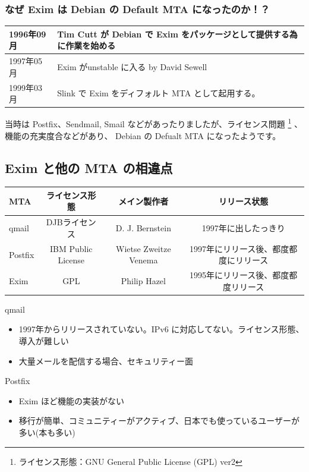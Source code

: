 \documentclass[mingoth,a4paper]{jsarticle}
\begin{document}
\subsubsection{なぜ Exim は Debian の Default MTA になったのか！？}

\begin{tabular}[htb]{|l|l|} \hline
1996年09月 & Tim Cutt が Debian で Exim をパッケージとして提供する為に作業を始める \\ \hline
1997年05月 & Exim がunstable に入る by David Sewell \\ \hline
1999年03月 & Slink で Exim をディフォルト MTA として起用する。\\ \hline
\end{tabular}

当時は Postfix、Sendmail, Smail などがあったりましたが、ライセンス問題
\footnote{ライセンス形態：GNU General Public License (GPL)  ver2}
、機能の充実度合などがあり、
Debian の Defualt MTA になったようです。

\subsection{Exim と他の MTA の相違点}

\begin{tabular}[htb]{|l|ccc|} \hline
MTA&ライセンス形態 & メイン製作者 & リリース状態 \\ \hline
qmail&DJBライセンス&D. J. Bernstein& 1997年に出したっきり\\ \hline
Postfix&IBM Public License&Wietse Zweitze Venema&1997年にリリース後、都度都度にリリース \\ \hline
Exim&GPL&Philip Hazel&1995年にリリース後、都度都度リリース \\ \hline
\end{tabular}

{\Large qmail}
\begin{itemize}
\item 1997年からリリースされていない。IPv6 に対応してない。ライセンス形態、導入が難しい
\item 大量メールを配信する場合、セキュリティー面
\end{itemize}

{\Large Postfix}
\begin{itemize}
\item Exim ほど機能の実装がない
\item 移行が簡単、コミュニティーがアクティブ、日本でも使っているユーザーが多い(本も多い)
\end{itemize}
\end{document}
